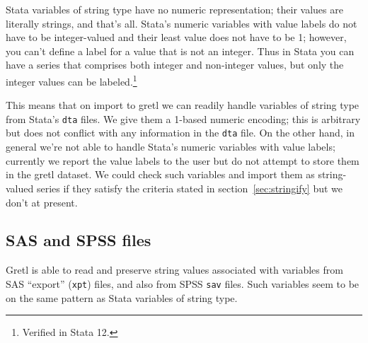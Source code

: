 Stata variables of string type have no numeric representation; their
values are literally strings, and that's all. Stata's numeric
variables with value labels do not have to be integer-valued and their
least value does not have to be 1; however, you can't define a label
for a value that is not an integer. Thus in Stata you can have a
series that comprises both integer and non-integer values, but only
the integer values can be labeled.\footnote{Verified in Stata 12.}

This means that on import to gretl we can readily handle variables of
string type from Stata's \texttt{dta} files. We give them a 1-based
numeric encoding; this is arbitrary but does not conflict with any
information in the \texttt{dta} file. On the other hand, in general
we're not able to handle Stata's numeric variables with value labels;
currently we report the value labels to the user but do not attempt to
store them in the gretl dataset. We could check such variables and
import them as string-valued series if they satisfy the criteria
stated in section~\ref{sec:stringify} but we don't at present.

\subsection{SAS and SPSS files}

Gretl is able to read and preserve string values associated with
variables from SAS ``export'' (\texttt{xpt}) files, and also from SPSS
\texttt{sav} files. Such variables seem to be on the same pattern as
Stata variables of string type.

